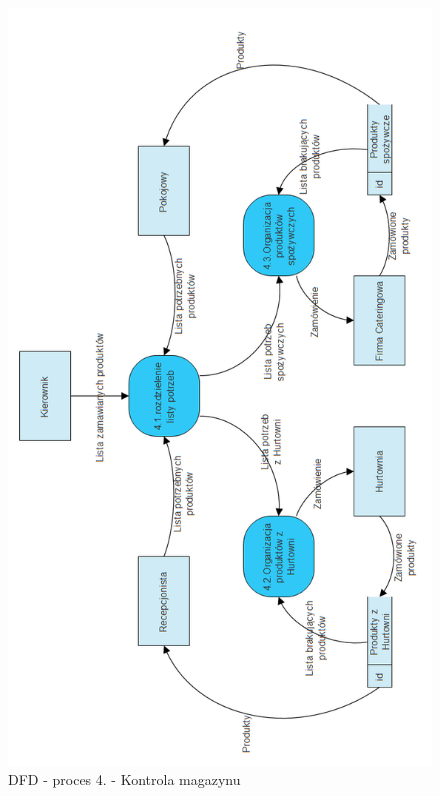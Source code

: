 \documentclass[a4paper, 11pt]{article}
\begin{document}
	\begin{figure}[H]%
			\center
			\includegraphics[scale=0.7]{Img/4.png}
			\caption{DFD - proces 4. - Kontrola magazynu }
	\end{figure}
\end{document}
